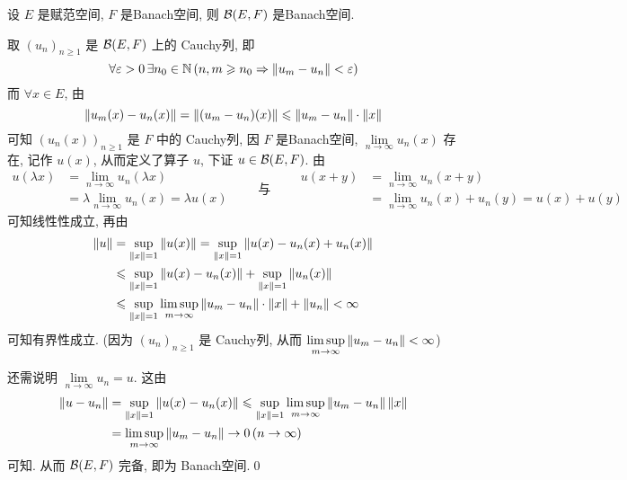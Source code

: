 \begin{Theorem}
	设 $ E $ 是赋范空间,  $ F $ 是Banach空间, 则 $ \mathcal{B}(E, F) $ 是Banach空间.
\end{Theorem}
\begin{Proof}
	取 $ (u_{n})_{n\geqslant1} $ 是 $ \mathcal{B}(E, F) $ 上的 Cauchy列, 即
	\[
		\forall\varepsilon>0\,\exists n_{0}\in\mathbb{N}\,(n, m\geqslant n_{0}\Rightarrow \left\| u_{m}-u_{n} \right\|<\varepsilon)
	\]
	而 $ \forall x\in E $, 由
	\[
		\left\| u_{m}(x)-u_{n}(x) \right\|=\left\| (u_{m}-u_{n})(x) \right\|\leqslant\left\| u_{m}-u_{n} \right\|\cdot\left\| x \right\|
	\]
	可知 $ (u_{n}(x))_{n\geqslant1} $ 是 $ F $ 中的 Cauchy列, 因 $ F $ 是Banach空间, $ \lim\limits_{n\to \infty} u_{n}(x) $ 存在, 记作 $ u(x) $, 从而定义了算子 $ u $, 下证 $ u\in\mathcal{B}(E, F) $. 由
	\[
		\begin{aligned}
			u(\lambda x) & =\lim_{n\to\infty}u_{n}(\lambda x)             \\
			             & =\lambda\lim_{n\to\infty}u_{n}(x)=\lambda u(x)
		\end{aligned}\qquad
		\text{与}\qquad
		\begin{aligned}
			u(x+y) & =\lim_{n\to\infty}u_{n}(x+y)                  \\
			       & =\lim_{n\to\infty}u_{n}(x)+u_{n}(y)=u(x)+u(y)
		\end{aligned}
	\]
	可知线性性成立, 再由
	\[
		\begin{aligned}
			\left\| u \right\| & =\sup_{\left\| x \right\|=1}\left\| u(x) \right\|=\sup_{\left\| x \right\|=1}\left\| u(x)-u_{n}(x)+u_{n}(x) \right\|                       \\
			         & \leqslant \sup_{\left\| x \right\|=1}\left\| u(x)-u_{n}(x) \right\|+\sup_{\left\| x \right\|=1}\left\| u_{n}(x) \right\|                   \\
			         & \leqslant \sup_{\left\| x \right\|=1}\limsup_{m\to\infty}\left\| u_{m}-u_{n} \right\|\cdot\left\| x \right\|+\left\| u_{n} \right\|<\infty
		\end{aligned}
	\]
	可知有界性成立. (因为 $ (u_{n})_{n\geqslant1} $ 是 Cauchy列, 从而 $ \limsup\limits_{m\to\infty}\left\| u_{m}-u_{n} \right\|<\infty $)

	还需说明 $ \lim\limits_{n\to\infty}u_{n}=u $. 这由
	\[
		\begin{aligned}
			\left\| u-u_{n} \right\| & =\sup_{\left\| x \right\|=1}\left\| u(x)-u_{n}(x) \right\|\leqslant \sup_{\left\| x \right\|=1}\limsup_{m\to\infty
			}\left\| u_{m}-u_{n} \right\|\left\| x \right\|                                                                           \\
			               & =\limsup_{m\to\infty}\left\| u_{m}-u_{n} \right\|\to 0\,(n\to\infty)
		\end{aligned}
	\]
	可知. 从而 $ \mathcal{B}(E, F) $ 完备, 即为 Banach空间.\qed
\end{Proof}

